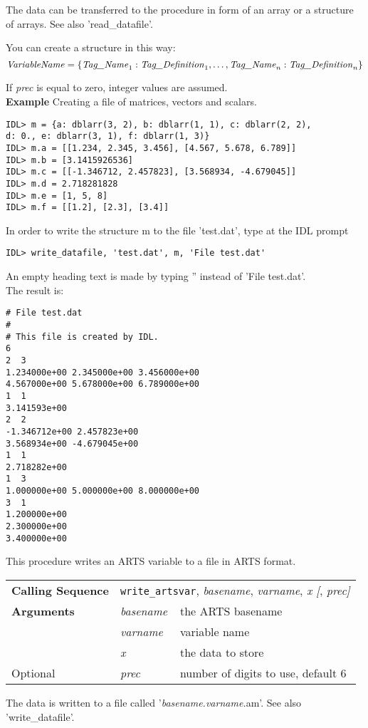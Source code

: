 The data can be transferred to the procedure in form of an array or a
structure of arrays. See also 'read\_datafile'.

You can create a structure in this way:
\begin{displaymath}
  \mbox{\textit{VariableName}} = 
  \{
  \mbox{\textit{Tag\_Name}}_1 : \mbox{\textit{Tag\_Definition}}_1,
  \ldots,
  \mbox{\textit{Tag\_Name}}_n : \mbox{\textit{Tag\_Definition}}_n
  \}
\end{displaymath}

If \textit{prec} is equal to zero, integer values are assumed. \\
\textbf{Example} \hspace{1ex} Creating a file of matrices, vectors and
scalars.
\begin{verbatim}
IDL> m = {a: dblarr(3, 2), b: dblarr(1, 1), c: dblarr(2, 2),
d: 0., e: dblarr(3, 1), f: dblarr(1, 3)}
IDL> m.a = [[1.234, 2.345, 3.456], [4.567, 5.678, 6.789]]
IDL> m.b = [3.1415926536]
IDL> m.c = [[-1.346712, 2.457823], [3.568934, -4.679045]]
IDL> m.d = 2.718281828
IDL> m.e = [1, 5, 8]
IDL> m.f = [[1.2], [2.3], [3.4]]
\end{verbatim}
In order to write the structure m to  the file 'test.dat', type at the
IDL prompt
\begin{verbatim}
IDL> write_datafile, 'test.dat', m, 'File test.dat'
\end{verbatim}
An empty heading text is made by typing '' instead of 'File test.dat'.
\\
The result is:
\begin{verbatim}
# File test.dat
#
# This file is created by IDL.
6
2  3
1.234000e+00 2.345000e+00 3.456000e+00
4.567000e+00 5.678000e+00 6.789000e+00
1  1
3.141593e+00
2  2
-1.346712e+00 2.457823e+00
3.568934e+00 -4.679045e+00
1  1
2.718282e+00
1  3
1.000000e+00 5.000000e+00 8.000000e+00
3  1
1.200000e+00
2.300000e+00
3.400000e+00
\end{verbatim}
This procedure writes an ARTS variable to a file in ARTS format.
\begin{center}
\begin{tabular}{|l|ll|}
  \hline
  \textbf{Calling Sequence} &
  \multicolumn{2}{l|}{\texttt{write\_artsvar}, %
                      \textit{basename}, \textit{varname}, %
                      \textit{x [}, \textit{prec]}}          \\
  \textbf{Arguments} & \textit{basename} & the ARTS basename \\
                     & \textit{varname}  & variable name     \\
                     & \textit{x}        & the data to store \\
  Optional           & \textit{prec}     &
                       number of digits to use, default 6    \\
  \hline
\end{tabular}
\end{center}
The data is written to a file called '\textit{basename.varname.}am'.
See also 'write\_datafile'. 


